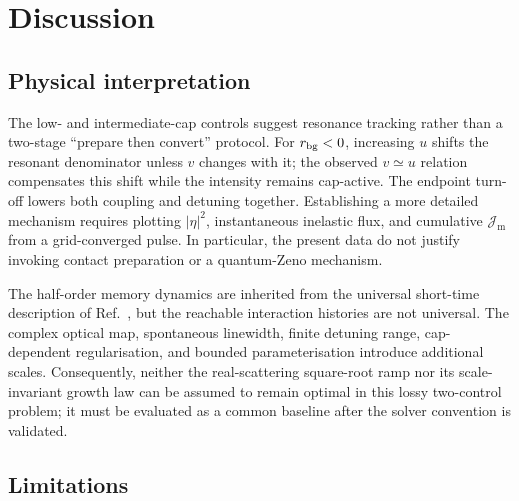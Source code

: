 \documentclass[9pt,a4paper,twocolumn,twoside]{rho-class/rho}
\newif\ifreportdraft
\newcommand{\draftnote}[1]{%
    \ifreportdraft
        \par\smallskip
        \noindent\textbf{\textsf{[TO COMPLETE]}} \textit{#1}
        \par\smallskip
    \fi
}
\newcommand{\Jmol}{\mathcal{J}_{\mathrm{m}}}
\begin{document}
        \draftnote{Calculate $k_r$ for the final cloud model, convert every optimised $u(t)$ through Eq.~\eqref{eq:intensity-conversion}, and compare the resulting peak power, modulation bandwidth, and duration with Table~\ref{tab:experimental-parameters}. Re-run the dynamics with the measured enhanced and background loss before claiming a quantitative $^{88}\mathrm{Sr}$ molecule yield.}

\section{Discussion}\label{sec:discussion}

    \subsection{Physical interpretation}

        The low- and intermediate-cap controls suggest resonance tracking rather
        than a two-stage ``prepare then convert'' protocol. For
        $r_{\rm bg}<0$, increasing $u$ shifts the resonant denominator unless
        $v$ changes with it; the observed $v\simeq u$ relation compensates this
        shift while the intensity remains cap-active. The endpoint turn-off
        lowers both coupling and detuning together. Establishing a more detailed
        mechanism requires plotting $|\eta|^2$, instantaneous inelastic flux,
        and cumulative $\Jmol$ from a grid-converged pulse. In particular, the
        present data do not justify invoking contact preparation or a
        quantum-Zeno mechanism.

        The half-order memory dynamics are inherited from the universal
        short-time description of Ref.~\cite{qi2021maximum}, but the reachable
        interaction histories are not universal. The complex optical map,
        spontaneous linewidth, finite detuning range, cap-dependent
        regularisation, and bounded parameterisation introduce additional
        scales. Consequently, neither the real-scattering square-root ramp nor
        its scale-invariant growth law can be assumed to remain optimal in this
        lossy two-control problem; it must be evaluated as a common baseline
        after the solver convention is validated.

    \subsection{Limitations}
\end{document}
